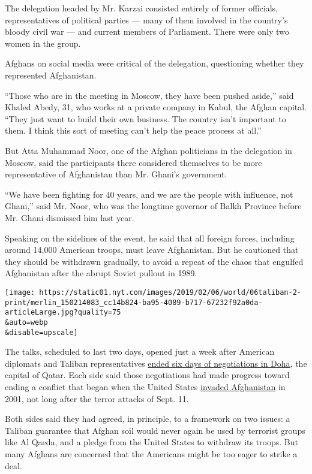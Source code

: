 The delegation headed by Mr. Karzai consisted entirely of former
officials, representatives of political parties --- many of them
involved in the country's bloody civil war --- and current members of
Parliament. There were only two women in the group.

Afghans on social media were critical of the delegation, questioning
whether they represented Afghanistan.

``Those who are in the meeting in Moscow, they have been pushed aside,''
said Khaled Abedy, 31, who works at a private company in Kabul, the
Afghan capital. ``They just want to build their own business. The
country isn't important to them. I think this sort of meeting can't help
the peace process at all.''

But Atta Muhammad Noor, one of the Afghan politicians in the delegation
in Moscow, said the participants there considered themselves to be more
representative of Afghanistan than Mr. Ghani's government.

``We have been fighting for 40 years, and we are the people with
influence, not Ghani,'' said Mr. Noor, who was the longtime governor of
Balkh Province before Mr. Ghani dismissed him last year.

Speaking on the sidelines of the event, he said that all foreign forces,
including around 14,000 American troops, must leave Afghanistan. But he
cautioned that they should be withdrawn gradually, to avoid a repeat of
the chaos that engulfed Afghanistan after the abrupt Soviet pullout in
1989.

\texttt{[image: https://static01.nyt.com/images/2019/02/06/world/06taliban-2-print/merlin\_150214083\_cc14b824-ba95-4089-b717-67232f92a0da-articleLarge.jpg?quality=75\\\&auto=webp\\\&disable=upscale]}

The talks, scheduled to last two days, opened just a week after American
diplomats and Taliban representatives
\href{https://www.nytimes.com/2019/01/28/world/asia/taliban-peace-deal-afghanistan.html}{ended
six days of negotiations in Doha}, the capital of Qatar. Each side said
those negotiations had made progress toward ending a conflict that began
when the United States
\href{https://www.nytimes.com/2001/11/08/world/nation-challenged-month-1-month-difficult-battlefield-assessing-us-war-strategy.html}{invaded
Afghanistan} in 2001, not long after the terror attacks of Sept. 11.

Both sides said they had agreed, in principle, to a framework on two
issues: a Taliban guarantee that Afghan soil would never again be used
by terrorist groups like Al Qaeda, and a pledge from the United States
to withdraw its troops. But many Afghans are concerned that the
Americans might be too eager to strike a deal.

